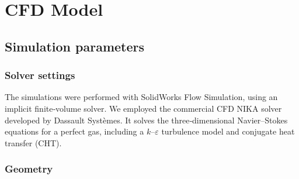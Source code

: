 \newpage
\section{CFD Model}

\subsection{Simulation parameters}
\label{subsec:simulation_parameters}

\subsubsection{Solver settings}

The simulations were performed with SolidWorks Flow Simulation, using an implicit finite‐volume solver. We employed the commercial CFD NIKA solver developed by Dassault Systèmes. It solves the three‐dimensional Navier–Stokes equations for a perfect gas, including a \(k\text{–}\varepsilon\) turbulence model and conjugate heat transfer (CHT).

\subsubsection{Geometry}

